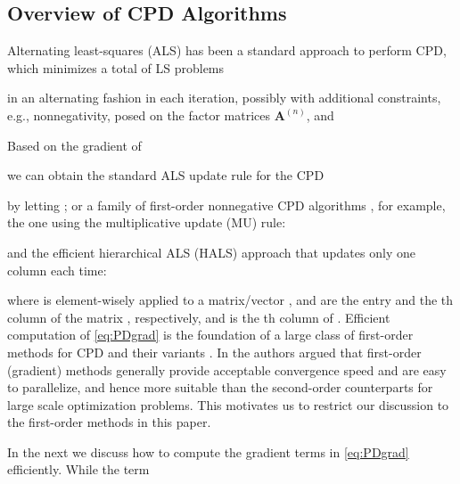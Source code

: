 \documentclass[10pt,twocolumn,twoside]{IEEEtran}
\newcommand{\matn}[2][n]{\ensuremath{\mathbf{#2}^{(#1)}}}
\begin{document}
\subsection{Overview of CPD Algorithms}
Alternating least-squares (ALS) has been a standard approach to perform CPD, which minimizes a total of  LS problems 

in an alternating fashion in each iteration, possibly with additional constraints, e.g., nonnegativity, posed on the factor matrices \matn{A}, and 
 
Based on the gradient of 
 
we can obtain the standard ALS update rule for the CPD
 
by letting ; or a family of first-order nonnegative CPD algorithms \cite{SPM_NMFNTD}, for example, the one using the multiplicative update (MU) rule:
 
and the efficient hierarchical ALS (HALS) approach that updates only one column each time:
  
where  is element-wisely applied to a matrix/vector \cite{TSP-lraNMF,SPM_NMFNTD},  and  are the  entry and the th column of the matrix , respectively, and  is the th column of . Efficient computation of \eqref{eq:PDgrad} is the foundation of a large class of first-order methods for CPD and their variants \cite{SPM_NMFNTD}.   In \cite{spm2014_ConvOpti} the authors argued that first-order (gradient) methods generally provide acceptable convergence speed and are easy to parallelize, and hence more suitable than the second-order counterparts for large scale optimization problems. This motivates us to restrict our discussion to the first-order methods in this paper.
 


In the next we discuss how to compute the gradient terms in \eqref{eq:PDgrad} efficiently. While the term 
\end{document}
